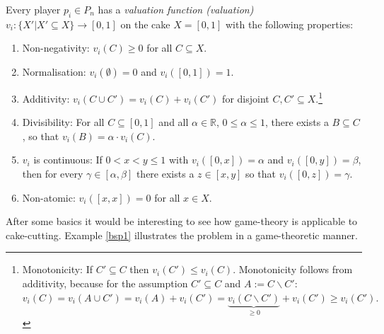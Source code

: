 Every player $p_i\in P_n$ has a \emph{valuation function (valuation)} $v_i:\{X'|X' \subseteq X\} \rightarrow [0,1]$ on the cake $X=[0,1]$ with the following properties:
\begin{enumerate}
\item Non-negativity: $v_i(C)\geq 0$ for all $C\subseteq X.$
\item Normalisation: $v_i(\emptyset)=0$ and $v_i([0,1])=1.$
\item Additivity: $v_i(C \cup C')=v_i(C)+v_i(C')$ for disjoint
$C,C'\subseteq X.$\footnote{Monotonicity: If $C' \subseteq C$ then $v_i(C') \leq v_i(C)$. Monotonicity follows from additivity, because for the assumption $C' \subseteq C$ and $A:=C\backslash C'$: $v_i(C)=v_i(A\cup C')=v_i(A)+v_i(C')=\underbrace{v_i(C\backslash C')}_{\geq 0}+v_i(C')\geq v_i(C').$}
\item Divisibility: For all $C\subseteq [0,1]$ and all $\alpha \in
\mathbb{R}$, $0\leq \alpha \leq 1$, there exists a $B\subseteq C$, so that
$v_i(B)=\alpha \cdot v_i(C).$
\item  $v_i$ is continuous: If $0<x<y\leq 1$ with $v_i([0,x])=\alpha$ and
$v_i([0,y])=\beta$, then for every $\gamma \in [\alpha,\beta]$ there exists a $z \in [x,y]$ so that $v_i([0,z])=\gamma.$
\item Non-atomic:  $v_i([x,x])=0$ for all $x\in X.$
\end{enumerate}
After some basics it would be interesting to see how game-theory is applicable to cake-cutting. Example \ref{bsp1} illustrates the problem in a game-theoretic manner.
%
